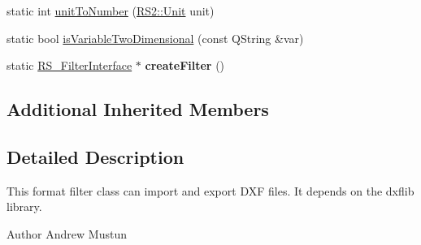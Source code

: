 \begin{DoxyCompactItemize}
\item 
static int \hyperlink{classRS__FilterDXF_af8b0db65f3b0754fb4db88e89d83b51b}{unit\-To\-Number} (\hyperlink{classRS2_ad859751df6978737e4f35ec111ff9828}{R\-S2\-::\-Unit} unit)
\item 
static bool \hyperlink{classRS__FilterDXF_a7acfbb252a0d692061c049097c812a6e}{is\-Variable\-Two\-Dimensional} (const Q\-String \&var)
\item 
\hypertarget{classRS__FilterDXF_a248e18d7dd983bd7fa6d220c2b1054c6}{static \hyperlink{classRS__FilterInterface}{R\-S\-\_\-\-Filter\-Interface} $\ast$ {\bfseries create\-Filter} ()}\label{classRS__FilterDXF_a248e18d7dd983bd7fa6d220c2b1054c6}

\end{DoxyCompactItemize}
\subsection*{Additional Inherited Members}


\subsection{Detailed Description}
This format filter class can import and export D\-X\-F files. It depends on the dxflib library.

\begin{DoxyAuthor}{Author}
Andrew Mustun 
\end{DoxyAuthor}


